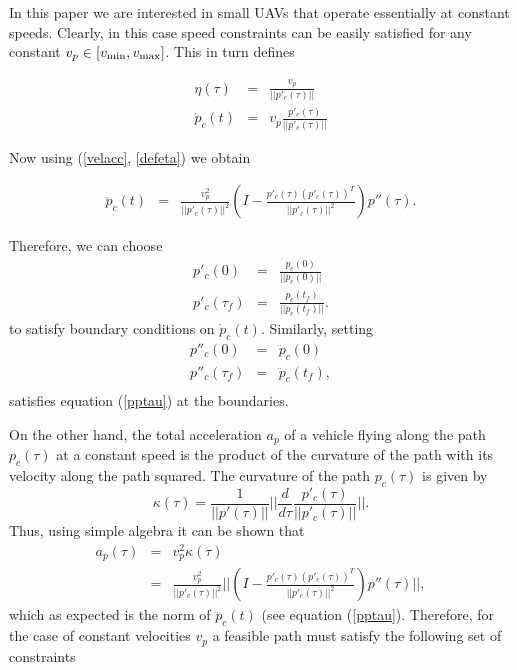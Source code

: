 \documentclass[]{aiaa-tc}%
\begin{document}

In this paper we are interested in small UAVs that operate essentially at constant speeds.
Clearly, in this case speed constraints can be easily satisfied for any constant $ v_p \in [v_{{\rm min}},
v_{{\rm max}} ]$. This in turn defines

\begin{eqnarray}
\eta(\tau) &=&  \frac{v_p}{||p'_c(\tau)||} \label{defeta}\\
\dot p_c(t) &=& v_p \frac{p'_c(\tau)}{|| p'_c(\tau)||} \label{ptau}
\end{eqnarray}

\noindent Now using (\ref{velacc}, \ref{defeta}) we obtain

\begin{eqnarray}
\ddot{p}_c(t)&=&\frac{v_p^2}{||p'_c(\tau)||^2} (I - \frac{p'_c(\tau)
(p'_c(\tau))^T}{||p'_c(\tau)||^2}) p''(\tau). \label{pptau}
\end{eqnarray}

\noindent Therefore, we can choose
\begin{eqnarray}
p'_c(0) &=& \frac{\dot p_c(0)}{||\dot p_c(0)||} \label{ptau0} \\
p'_c(\tau_f) &=& \frac{\dot p_c(t_f)}{||\dot p_c(t_f)||}.
\label{ptauf}
\end{eqnarray}
\noindent to satisfy boundary conditions on $\dot p_c(t)$. Similarly, setting
\begin{eqnarray*}
p''_c(0) &=& \ddot p_c(0) \label{pptau0} \\
p''_c(\tau_f) &=& \ddot p_c(t_f)  \label{pptauf}, \\
\end{eqnarray*}
satisfies equation (\ref{pptau}) at the boundaries.

On the other hand, the total acceleration $a_p$
of a vehicle flying along the path $p_c(\tau)$ at a constant speed is the product of the curvature of
the path with its velocity along the path squared. The curvature of the path $p_c(\tau)$ is given by
\[
\kappa(\tau) = \frac{1}{||p'(\tau)||}
||\frac{d}{d \tau} \frac {p'_c(\tau)}{||p'_c(\tau)||}||.
\]
\noindent Thus, using simple algebra it can be shown that
\begin{eqnarray*}
a_p(\tau) &=& v^2_p \kappa(\tau) \\
    &=&\frac{v_p^2}{||p'_c(\tau)||^2}
||(I - \frac{p'_c(\tau)(p'_c(\tau))^T}{||p'_c(\tau)||^2}) p''(\tau)||,
\end{eqnarray*}
\noindent which as expected is the norm of $\ddot p_c(t)$ (see equation (\ref{pptau}).
Therefore, for the case of constant
velocities $v_p$ a feasible path must satisfy the following set
of constraints
\end{document}
